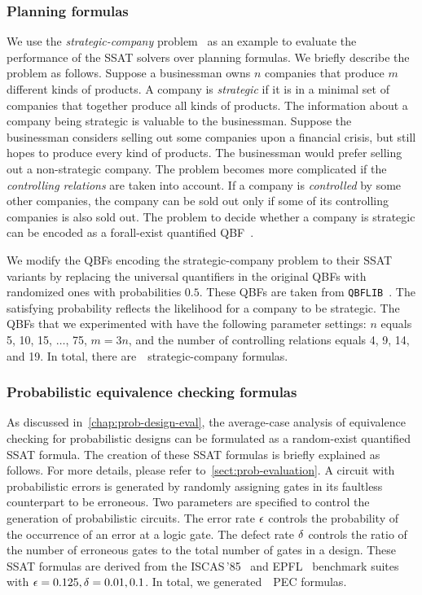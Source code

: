 \subsubsection{Planning formulas}
We use the \textit{strategic-company} problem~\cite{Cadoli1997} as an example
to evaluate the performance of the SSAT solvers over planning formulas.
We briefly describe the problem as follows.
Suppose a businessman owns $n$ companies that produce $m$ different kinds of products.
A company is \textit{strategic} if it is in a minimal set of companies that together produce all kinds of products.
The information about a company being strategic is valuable to the businessman.
Suppose the businessman considers selling out some companies upon a financial crisis,
but still hopes to produce every kind of products.
The businessman would prefer selling out a non-strategic company.
The problem becomes more complicated if the \textit{controlling relations} are taken into account.
If a company is \textit{controlled} by some other companies,
the company can be sold out only if some of its controlling companies is also sold out.
The problem to decide whether a company is strategic can be encoded as a forall-exist quantified QBF~\cite{Faber2005,Leone2006}.

We modify the QBFs encoding the strategic-company problem
to their SSAT variants by replacing the universal quantifiers in the original QBFs
with randomized ones with probabilities $0.5$.
These QBFs are taken from \texttt{QBFLIB}~\cite{Narizzano2006}.
The satisfying probability reflects the likelihood for a company to be strategic.
The QBFs that we experimented with have the following parameter settings:
$n$ equals 5, 10, 15, $\ldots$, 75, $m=3n$,
and the number of controlling relations equals 4, 9, 14, and 19.
In total, there are~\nstrategic~strategic-company formulas.

\subsubsection{Probabilistic equivalence checking formulas}
As discussed in~\cref{chap:prob-design-eval},
the average-case analysis of equivalence checking for probabilistic designs
can be formulated as a random-exist quantified SSAT formula.
The creation of these SSAT formulas is briefly explained as follows.
For more details, please refer to~\cref{sect:prob-evaluation}.
A circuit with probabilistic errors is generated by
randomly assigning gates in its faultless counterpart to be erroneous.
Two parameters are specified to control the generation of probabilistic circuits.
The error rate $\epsilon$ controls the probability of the occurrence of an error at a logic gate.
The defect rate $\delta$ controls the ratio of the number of erroneous gates to the total number of gates in a design.
These SSAT formulas are derived from the ISCAS\,'85~\cite{ISCAS85-benchmark}
and EPFL~\cite{EPFL-benchmark} benchmark suites with $\epsilon=0.125,\delta=0.01,0.1$.
In total, we generated~\npec~PEC formulas.

